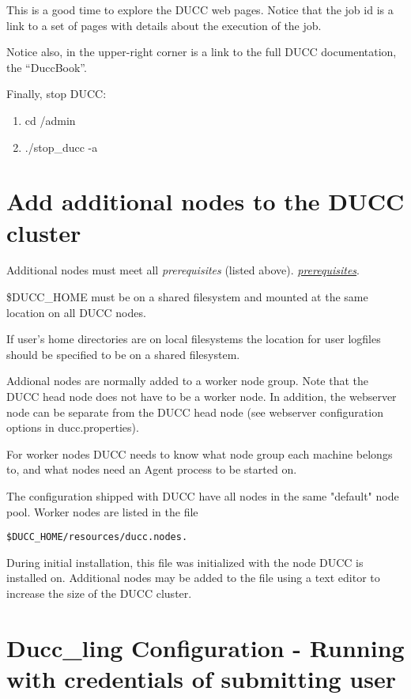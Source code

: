     This is a good time to explore the DUCC web pages.  Notice that the job id is a link to a set of
    pages with details about the execution of the job.

    Notice also, in the upper-right corner is a link to the full DUCC documentation, the ``DuccBook''.

    Finally, stop DUCC:
    \begin{enumerate}
      \item cd \duccruntime/admin
      \item./stop\_ducc -a
      \end{enumerate}
      

\section{Add additional nodes to the DUCC cluster}
   Additional nodes must meet all 
   \ifdefined\DUCCSTANDALONE
   {\em prerequisites} (listed above).
   \else
   \hyperref[sec:install.prerequisites]{\em prerequisites}.
   \fi

   \$DUCC\_HOME must be on a shared filesystem and mounted at the same location
   on all DUCC nodes.

   If user's home directories are on local filesystems the location for user logfiles
   should be specified to be on a shared filesystem. 

   Addional nodes are normally added to a worker node group. Note that the
   DUCC head node does not have to be a worker node.
   In addition, the webserver node can be separate from the DUCC head node 
   (see webserver configuration options in ducc.properties).

   For worker nodes DUCC needs to know what node group
   each machine belongs to, and what nodes need an Agent process to be started on.

   The configuration shipped with DUCC have all nodes in the same "default" node pool.
   Worker nodes are listed in the file
\begin{verbatim}
$DUCC_HOME/resources/ducc.nodes.  
\end{verbatim}
   
   During initial installation, this file was initialized with the node DUCC is installed on.
   Additional nodes may be added to the file using a text editor to increase the size of the DUCC
   cluster.


\section{Ducc\_ling Configuration - Running with credentials of submitting user}
\label{sec:duccling.install}

